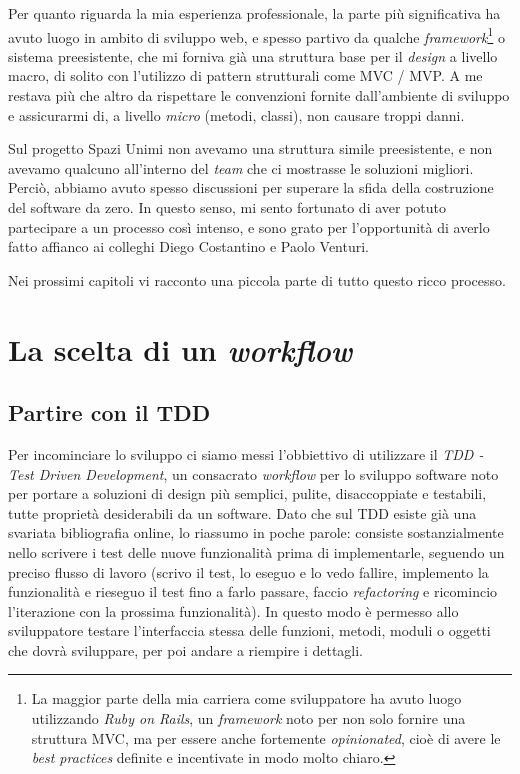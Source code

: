 \documentclass[12pt]{report}
\begin{document}
Per quanto riguarda la mia esperienza professionale, la parte più
significativa ha avuto luogo in ambito di sviluppo web, 
e spesso partivo da qualche
\textit{framework}\footnote{
	La maggior parte della mia carriera come sviluppatore ha avuto luogo
	utilizzando \textit{Ruby on Rails}, un \textit{framework} noto per non
	solo fornire una struttura MVC, ma per essere anche fortemente
	\textit{opinionated}, cioè di avere le \textit{best practices}
	definite e incentivate in modo molto chiaro.
} 
o sistema preesistente, che mi forniva già una struttura base
per il \textit{design} a livello macro, 
di solito con l'utilizzo di pattern strutturali come MVC / MVP.
A me restava più che altro da rispettare le convenzioni fornite dall'ambiente di
sviluppo e assicurarmi di, a livello \textit{micro} (metodi, classi), non
causare troppi danni.

Sul progetto Spazi Unimi non avevamo una struttura simile preesistente, e non
avevamo qualcuno all'interno del \textit{team} che ci mostrasse le
soluzioni migliori. Perciò,  abbiamo avuto spesso discussioni per superare la
sfida della costruzione del software da zero. In questo senso,
mi sento fortunato di aver potuto partecipare a un processo
così intenso, e sono grato per l'opportunità di averlo fatto affianco
ai colleghi Diego Costantino e Paolo Venturi. 

Nei prossimi capitoli vi racconto una piccola parte di tutto questo ricco
processo.

% 
% 
\chapter{La scelta di un \textit{workflow}}
\label{cap:scelta_di_workflow}


\section{Partire con il TDD}

Per incominciare lo sviluppo ci siamo messi l'obbiettivo di utilizzare il
\textit{TDD - Test Driven Development}, un consacrato \textit{workflow} per lo
sviluppo software noto per portare a soluzioni di design più semplici, pulite,
disaccoppiate e testabili, tutte proprietà desiderabili da un software. Dato
che sul TDD esiste già una svariata bibliografia online, lo riassumo in poche
parole: consiste sostanzialmente nello scrivere i test delle nuove
funzionalità prima di implementarle, seguendo un preciso flusso di lavoro
(scrivo il test, lo eseguo e lo vedo fallire, implemento la funzionalità e
rieseguo il test fino a farlo passare, faccio \textit{refactoring} e
ricomincio l'iterazione con la prossima funzionalità). 
In questo modo è permesso allo
sviluppatore testare l'interfaccia stessa delle funzioni, metodi, moduli o
oggetti che dovrà sviluppare, per poi andare a riempire i dettagli.
\end{document}
